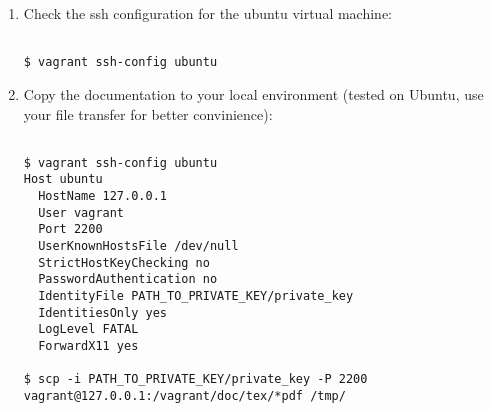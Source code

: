 \begin{enumerate}

\item Check the ssh configuration for the ubuntu virtual machine:

\begin{lstlisting}[breaklines=true, style=bash]

$ vagrant ssh-config ubuntu

\end{lstlisting}

\item Copy the documentation to your local environment (tested on Ubuntu, use your file transfer for better convinience):

\begin{lstlisting}[breaklines=true, style=bash]

$ vagrant ssh-config ubuntu
Host ubuntu
  HostName 127.0.0.1
  User vagrant
  Port 2200
  UserKnownHostsFile /dev/null
  StrictHostKeyChecking no
  PasswordAuthentication no
  IdentityFile PATH_TO_PRIVATE_KEY/private_key
  IdentitiesOnly yes
  LogLevel FATAL
  ForwardX11 yes

$ scp -i PATH_TO_PRIVATE_KEY/private_key -P 2200 vagrant@127.0.0.1:/vagrant/doc/tex/*pdf /tmp/

\end{lstlisting}

\end{enumerate}
